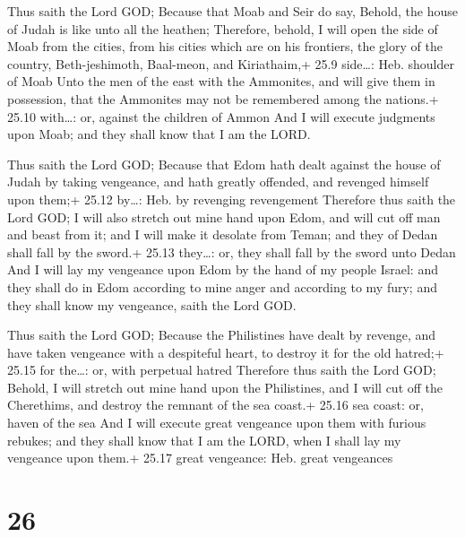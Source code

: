  Thus saith the Lord GOD; Because that Moab and Seir do
say, Behold, the house of Judah is like unto all the heathen;
 Therefore, behold, I will open the side of Moab from the
cities, from his cities which are on his frontiers, the glory of the
country, Beth-jeshimoth, Baal-meon, and Kiriathaim,+ 25.9 side\ldots:
Heb. shoulder of Moab  Unto the men of the east with the
Ammonites, and will give them in possession, that the Ammonites may not
be remembered among the nations.+ 25.10 with\ldots: or, against the
children of Ammon  And I will execute judgments upon Moab;
and they shall know that I am the LORD.

 Thus saith the Lord GOD; Because that Edom hath dealt
against the house of Judah by taking vengeance, and hath greatly
offended, and revenged himself upon them;+ 25.12 by\ldots: Heb. by
revenging revengement  Therefore thus saith the Lord GOD; I
will also stretch out mine hand upon Edom, and will cut off man and
beast from it; and I will make it desolate from Teman; and they of Dedan
shall fall by the sword.+ 25.13 they\ldots: or, they shall fall by the
sword unto Dedan  And I will lay my vengeance upon Edom by
the hand of my people Israel: and they shall do in Edom according to
mine anger and according to my fury; and they shall know my vengeance,
saith the Lord GOD.

 Thus saith the Lord GOD; Because the Philistines have
dealt by revenge, and have taken vengeance with a despiteful heart, to
destroy it for the old hatred;+ 25.15 for the\ldots: or, with perpetual
hatred  Therefore thus saith the Lord GOD; Behold, I will
stretch out mine hand upon the Philistines, and I will cut off the
Cherethims, and destroy the remnant of the sea coast.+ 25.16 sea coast:
or, haven of the sea  And I will execute great vengeance
upon them with furious rebukes; and they shall know that I am the LORD,
when I shall lay my vengeance upon them.+ 25.17 great vengeance: Heb.
great vengeances

\hypertarget{section-25}{%
\section{26}\label{section-25}}

